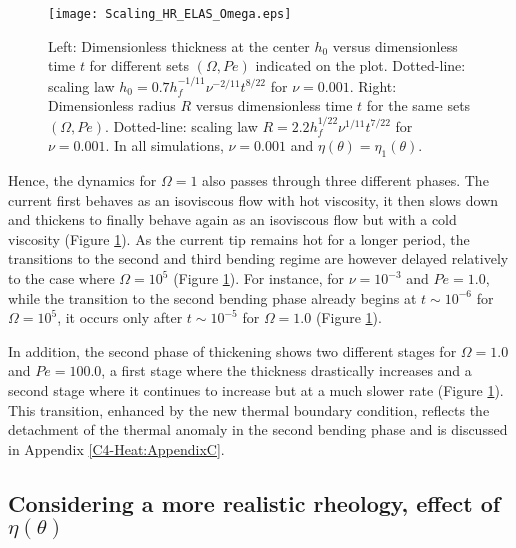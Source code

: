 \begin{figure}[h!]
  \begin{center}
    \graphicspath{ {/Users/thorey/Documents/These/Projet/Refroidissement/Skin_Model/Figure/Figure_Heating/} }
    \texttt{[image: Scaling\_HR\_ELAS\_Omega.eps]}
    \caption{Left: Dimensionless thickness at  the center $h_0$ versus
      dimensionless   time  $t$   for  different   sets  $(\Omega,Pe)$
      indicated    on   the    plot.     Dotted-line:   scaling    law
      $h_0=   0.7h_f^{-1/11}\nu^{-2/11}t^{8/22}$    for   $\nu=0.001$.
      Right: Dimensionless  radius $R$  versus dimensionless  time $t$
      for  the  same  sets $(\Omega,Pe)$.   Dotted-line:  scaling  law
      $R= 2.2h_f^{1/22}\nu^{1/11}t^{7/22}$ for $\nu  = 0.001$.  In all
      simulations, $\nu=0.001$ and $\eta(\theta)=\eta_1(\theta)$.}
    \label{C4-Scaling_HR_ELAS_Omega}
  \end{center}
\end{figure}


Hence, the dynamics for $\Omega=1$ also passes through three different
phases.   The current  first behaves  as an  isoviscous flow  with hot
viscosity, it then slows down and  thickens to finally behave again as
an   isoviscous    flow   but   with   a    cold   viscosity   (Figure
\ref{C4-Scaling_HR_ELAS_Omega}).  As the current tip remains hot for a
longer period, the transitions to the second and third bending
regime are however delayed relatively to the case where $\Omega= 10^5$
(Figure    \ref{C4-Scaling_HR_ELAS_Omega}).     For   instance,    for
$\nu=10^{-3}$ and $Pe=1.0$, while the transition to the second bending
phase already begins at $t\sim 10^{-6}$ for $\Omega=10^{5}$, it occurs
only    after   $t\sim    10^{-5}$   for    $\Omega=   1.0$    (Figure
\ref{C4-Scaling_HR_ELAS_Omega}).

In addition, the second phase of thickening shows two different stages
for $\Omega =  1.0$ and $Pe=100.0$, a first stage  where the thickness
drastically  increases  and  a  second stage  where  it  continues  to
increase     but     at     a     much     slower     rate     (Figure
\ref{C4-Scaling_HR_ELAS_Omega}).  This transition, enhanced by the new
thermal  boundary condition,  reflects the  detachment of  the thermal
anomaly  in the  second bending  phase  and is  discussed in  Appendix
\ref{C4-Heat:AppendixC}.

\subsection{Considering   a  more   realistic   rheology,  effect   of
  $\eta(\theta)$}
\label{C4-sec:eta_influence-el}


